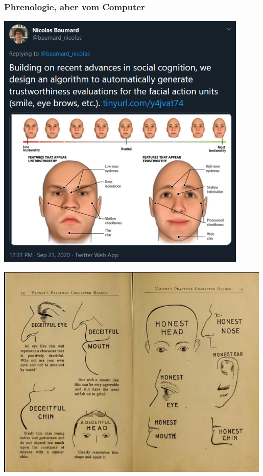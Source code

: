 \documentclass[aspectratio=169,xcolor=dvipsnames]{beamer}
\begin{document}
\begin{frame}
\frametitle{Phrenologie, aber vom Computer}
\begin{minipage}{.455\textwidth}
\begin{center}
\includegraphics[width=0.9\textwidth, keepaspectratio]{images/phrenology.png}
\end{center}
\end{minipage}\begin{minipage}{.545\textwidth}
\begin{center}
\includegraphics[width=0.99\textwidth, keepaspectratio]{images/phrenology.jpg}
\end{center}
\end{minipage}
\end{frame}
\end{document}
